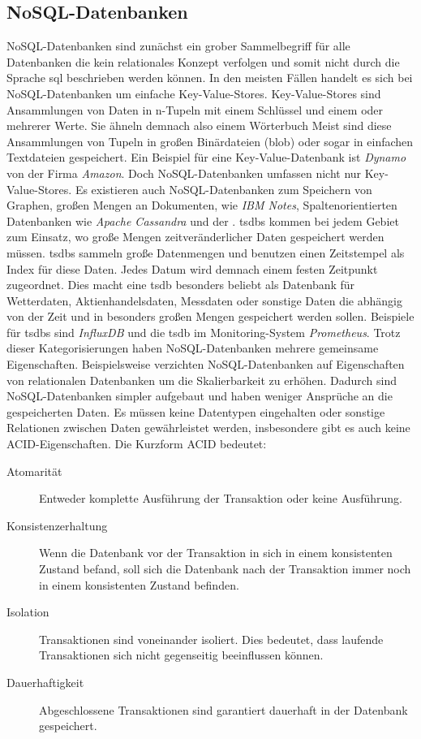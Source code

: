 \documentclass[titlepage]{report}
\begin{document}
\subsection{NoSQL\hyp{}Datenbanken}
NoSQL\hyp{}Datenbanken sind zunächst ein grober Sammelbegriff für alle
Datenbanken die kein relationales Konzept verfolgen und somit nicht
durch die Sprache \gls{sql} beschrieben werden können. In den meisten
Fällen handelt es sich bei NoSQL\hyp{}Datenbanken um einfache
Key\hyp{}Value\hyp{}Stores. Key\hyp{}Value\hyp{}Stores sind Ansammlungen
von Daten in n\hyp{}Tupeln mit einem Schlüssel und einem oder mehrerer
Werte. Sie ähneln
demnach also einem Wörterbuch  Meist sind diese Ansammlungen von Tupeln
in großen Binärdateien (\gls{blob}) oder sogar in einfachen Textdateien
gespeichert. Ein Beispiel für eine Key\hyp{}Value\hyp{}Datenbank ist
\emph{Dynamo} von der Firma \emph{Amazon}. Doch NoSQL\hyp{}Datenbanken
umfassen nicht nur Key\hyp{}Value\hyp{}Stores. Es existieren auch
NoSQL\hyp{}Datenbanken zum Speichern von Graphen, großen Mengen an
Dokumenten, wie \emph{IBM Notes}, Spaltenorientierten Datenbanken wie
\emph{Apache Cassandra} und der . \glspl{tsdb} kommen bei
jedem Gebiet zum Einsatz, wo große Mengen zeitveränderlicher Daten
gespeichert werden müssen. \glspl{tsdb} sammeln große Datenmengen und
benutzen einen Zeitstempel als Index für diese Daten. Jedes Datum wird
demnach einem festen Zeitpunkt zugeordnet. Dies macht eine \gls{tsdb}
besonders beliebt als Datenbank für Wetterdaten,
Aktienhandelsdaten, Messdaten oder sonstige Daten die abhängig von der
Zeit und in besonders großen Mengen gespeichert werden sollen. Beispiele
für \glspl{tsdb} sind \emph{InfluxDB} und die \gls{tsdb} im
Monitoring-System \emph{Prometheus}. Trotz dieser Kategorisierungen
haben NoSQL\hyp{}Datenbanken mehrere gemeinsame Eigenschaften.
Beispielsweise verzichten NoSQL\hyp{}Datenbanken auf Eigenschaften von
relationalen Datenbanken um die Skalierbarkeit zu erhöhen\cite[S. 13]{TSDB}. Dadurch sind
NoSQL\hyp{}Datenbanken simpler aufgebaut und haben weniger Ansprüche an
die gespeicherten Daten. Es müssen keine Datentypen eingehalten oder
sonstige Relationen zwischen Daten gewährleistet werden, insbesondere
gibt es auch keine ACID\hyp{}Eigenschaften. Die Kurzform ACID 
bedeutet\cite{NOSQLKRAMER}\cite{SQLLEIPZIG}:
\begin{description}
    \item[Atomarität] Entweder komplette Ausführung der Transaktion oder
        keine Ausführung.
    \item[Konsistenzerhaltung] Wenn die Datenbank vor der Transaktion in
        sich in einem konsistenten Zustand befand, soll sich die
        Datenbank nach der Transaktion immer noch in einem konsistenten
        Zustand befinden.
    \item[Isolation] Transaktionen sind voneinander isoliert. Dies
        bedeutet, dass laufende Transaktionen sich nicht gegenseitig
        beeinflussen können.
    \item[Dauerhaftigkeit] Abgeschlossene Transaktionen sind garantiert
        dauerhaft in der Datenbank gespeichert.
\end{description}
\end{document}
